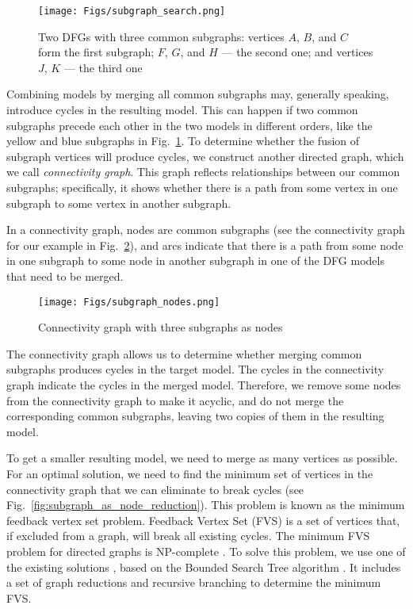\documentclass[11pt]{article}
\theoremstyle{definition}
\begin{document}
\begin{figure}[htb]
    \centering
    \texttt{[image: Figs/subgraph\_search.png]}
    \caption{Two DFGs with three common subgraphs: vertices $A$, $B$, and $C$ form the first subgraph; $F$, $G$, and $H$ --- the second one; and vertices $J$, $K$ --- the third one}
    \label{fig:common_subgraphs}
\end{figure}

Combining models by merging all common subgraphs may,  generally speaking, introduce cycles in the resulting model. 
This can happen if two common subgraphs precede each other in the two models in different orders, like the yellow and blue subgraphs in Fig.~\ref{fig:common_subgraphs}. 
To determine whether the fusion of subgraph vertices will produce cycles, we construct another directed graph, which we call \emph{connectivity graph}. 
This graph reflects relationships between our common subgraphs; specifically, it shows whether there is a path from some vertex in one subgraph to some vertex in another subgraph. 

In a connectivity graph, nodes are common subgraphs (see the connectivity graph for our example in Fig.~\ref{fig:subgraph_as_node}), and arcs indicate that there is a path from some node in one subgraph to some node in another subgraph in one of the DFG models that need to be merged.

\begin{figure}[htb]
    \centering
    \texttt{[image: Figs/subgraph\_nodes.png]}
    \caption{Connectivity graph with three subgraphs as nodes}
    \label{fig:subgraph_as_node}
\end{figure}

The connectivity graph allows us to determine whether merging common subgraphs produces cycles in the target model. 
The cycles in the connectivity graph indicate the cycles in the merged model. Therefore, we remove some nodes from the connectivity graph to make it acyclic, and do not merge the corresponding common subgraphs, leaving two copies of them in the resulting model.

To get a smaller resulting model, we need to merge as many vertices as possible. For an 
 optimal solution, we need to find the minimum set of vertices in the connectivity graph that we can eliminate to break cycles (see Fig.~\ref{fig:subgraph_as_node_reduction}). 
This problem is known as the minimum feedback vertex set problem. Feedback Vertex Set (FVS) is a set of vertices that, if excluded from a graph, will break all existing cycles. The minimum FVS problem for directed graphs is NP-complete \citep{Karp1972-la}. To solve this problem, we use one of the existing solutions \citep{FeedbackVertexSet}, based on the Bounded Search Tree algorithm \citep{Cygan2015-kt}. It includes a set of graph reductions and recursive branching to determine the minimum FVS.
\end{document}

